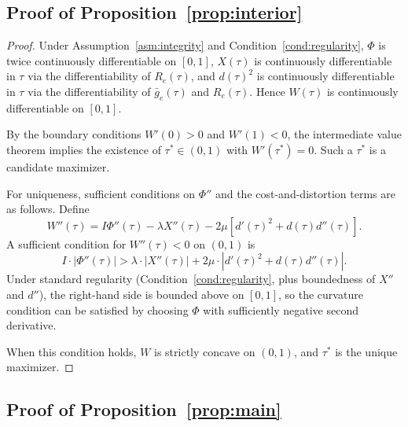 \subsection{Proof of Proposition~\ref{prop:interior}}
\label{ssec:proof_interior}

\begin{proof}
Under Assumption~\ref{asm:integrity} and Condition~\ref{cond:regularity}, $\Phi$ is twice continuously differentiable on $[0, 1]$, $X(\tau)$ is continuously differentiable in $\tau$ via the differentiability of $R_e(\tau)$, and $d(\tau)^2$ is continuously differentiable in $\tau$ via the differentiability of $\bar g_e(\tau)$ and $R_e(\tau)$. Hence $W(\tau)$ is continuously differentiable on $[0, 1]$.

By the boundary conditions $W'(0) > 0$ and $W'(1) < 0$, the intermediate value theorem implies the existence of $\tau^* \in (0, 1)$ with $W'(\tau^*) = 0$. Such a $\tau^*$ is a candidate maximizer.

For uniqueness, sufficient conditions on $\Phi''$ and the cost-and-distortion terms are as follows. Define
\[
W''(\tau) = I \Phi''(\tau) - \lambda X''(\tau) - 2\mu [d'(\tau)^2 + d(\tau) d''(\tau)].
\]
A sufficient condition for $W''(\tau) < 0$ on $(0, 1)$ is
\[
I \cdot |\Phi''(\tau)| > \lambda \cdot |X''(\tau)| + 2\mu \cdot |d'(\tau)^2 + d(\tau) d''(\tau)|.
\]
Under standard regularity (Condition~\ref{cond:regularity}, plus boundedness of $X''$ and $d''$), the right-hand side is bounded above on $[0, 1]$, so the curvature condition can be satisfied by choosing $\Phi$ with sufficiently negative second derivative.

When this condition holds, $W$ is strictly concave on $(0, 1)$, and $\tau^*$ is the unique maximizer.
\end{proof}

\subsection{Proof of Proposition~\ref{prop:main}}
\label{ssec:proof_main}

